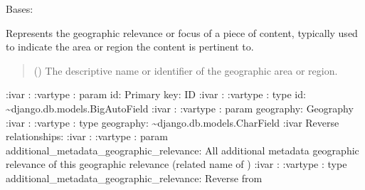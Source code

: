 \documentclass[letterpaper,10pt,english]{sphinxmanual}
\begin{document}

\begin{fulllineitems}
\label{\detokenize{source/meta_models_management:meta_models_management.models.GeographicRelevance}}
\pysigstartsignatures
{}
\pysigstopsignatures
\sphinxAtStartPar
Bases: 

\sphinxAtStartPar
Represents the geographic relevance or focus of a piece of content, typically used to indicate the area or region the content is pertinent to.
\begin{quote}\begin{description}
\sphinxAtStartPar
{} () \textendash{} The descriptive name or identifier of the geographic area or region.

\end{description}\end{quote}

\sphinxAtStartPar
:ivar : 
:vartype : param id: Primary key: ID
:ivar : 
:vartype : type id: \textasciitilde{}django.db.models.BigAutoField
:ivar : 
:vartype : param geography: Geography
:ivar :
:vartype : type geography: \textasciitilde{}django.db.models.CharField
:ivar Reverse relationships:
:ivar : 
:vartype : param additional\_metadata\_geographic\_relevance: All additional metadata geographic relevance of this geographic relevance (related name of )
:ivar : 
:vartype : type additional\_metadata\_geographic\_relevance: Reverse  from {\hyperref[\detokenize{source/meta_models_management:meta_models_management.models.AdditionalMetadata}]{}}


\end{fulllineitems}
\end{document}
